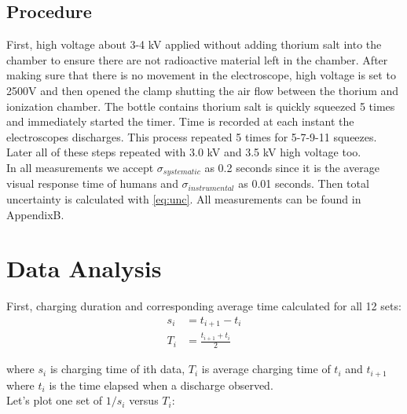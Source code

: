 \documentclass[reprint,amsmath,aps,nofootinbib,english]{revtex4-2}
\begin{document}
\subsection{Procedure}
First, high voltage about 3-4 kV applied without adding thorium salt into the chamber to ensure there are not radioactive material left in the chamber. After making sure that there is no movement in the electroscope, high voltage is set to 2500V and then opened the clamp shutting the air flow between the thorium and ionization chamber. The bottle contains thorium salt is quickly squeezed 5 times and immediately started the timer. Time is recorded at each instant the electroscopes discharges. This process repeated 5 times for 5-7-9-11 squeezes. Later all of these steps repeated with 3.0 kV and 3.5 kV high voltage too.\\

In all measurements we accept  $\sigma_{systematic}$ as 0.2 seconds since it is the average visual response time of humans \cite{Jain2015} and $\sigma_{instrumental}$ as 0.01 seconds. Then total uncertainty is calculated with \eqref{eq:unc}. All measurements can be found in AppendixB.

\section{Data Analysis}
First, charging duration and corresponding average time calculated for all 12 sets:
\begin{align}
  s_i &= t_{i+1} - t_i \\
  T_i &= \frac{t_{i+1} + t_i}{2}
\end{align}

where $s_i$ is charging time of ith data, $T_i$ is average charging time of $t_i$ and $t_{i+1}$ where $t_i$ is the time elapsed when a discharge observed.\\

Let's plot one set of $1/s_i$ versus $T_i$:
\end{document}
